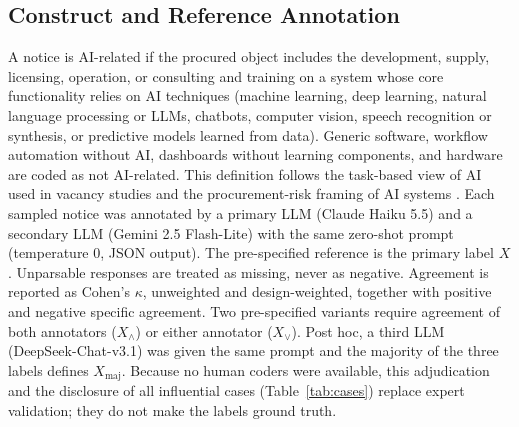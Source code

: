 \documentclass[runningheads]{llncs}
\begin{document}
\subsection{Construct and Reference Annotation}
A notice is AI-related if the procured object includes the development, supply, licensing, operation, or consulting and training on a system whose core functionality relies on AI techniques (machine learning, deep learning, natural language processing or LLMs, chatbots, computer vision, speech recognition or synthesis, or predictive models learned from data). Generic software, workflow automation without AI, dashboards without learning components, and hardware are coded as not AI-related. This definition follows the task-based view of AI used in vacancy studies \cite{acemoglu2022} and the procurement-risk framing of AI systems \cite{hickok2022}. Each sampled notice was annotated by a primary LLM (Claude Haiku 5.5) and a secondary LLM (Gemini 2.5 Flash-Lite) with the same zero-shot prompt (temperature 0, JSON output). The pre-specified reference is the primary label $X$. Unparsable responses are treated as missing, never as negative. Agreement is reported as Cohen's $\kappa$, unweighted and design-weighted, together with positive and negative specific agreement. Two pre-specified variants require agreement of both annotators ($X_\wedge$) or either annotator ($X_\vee$). Post hoc, a third LLM (DeepSeek-Chat-v3.1) was given the same prompt and the majority of the three labels defines $X_{\mathrm{maj}}$. %
Because no human coders were available, this adjudication and the disclosure of all influential cases (Table~\ref{tab:cases}) replace expert validation; they do not make the labels ground truth.
\end{document}
